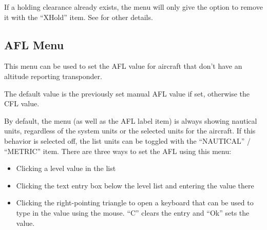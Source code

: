 \documentclass[a4paper,oneside,11pt]{memoir}
\begin{document}
If a holding clearance already exists, the menu will only give the option to remove it with the “XHold” item.
See  for other details.

\subsection{AFL Menu}
\label{menu:afl}

\begin{center}
  \begin{minipage}[b]{0.14\textwidth}\end{minipage}\hfill 
  \begin{minipage}[b]{0.14\textwidth}\end{minipage}\hfill 
  \begin{minipage}[b]{0.14\textwidth}\end{minipage}\hfill  
  \begin{minipage}[b]{0.14\textwidth}\end{minipage}\hfill 
  \begin{minipage}[b]{0.14\textwidth}\end{minipage}\hfill 
\end{center}  

This menu can be used to set the AFL value for aircraft that don’t have an altitude reporting transponder.

\bigskip

The default value is the previously set manual AFL value if set, otherwise the CFL value.

\bigskip

By default, the menu (as well as the AFL label item) is always showing nautical units, regardless of the system units or the selected units for the aircraft. If this behavior is selected off, the list units can be toggled with the “NAUTICAL” / “METRIC” item. There are three ways to set the AFL using this menu:

\bigskip

\begin{itemize}
        \item Clicking a level value in the list
        \item Clicking the text entry box below the level list and entering the value there
        \item Clicking the right-pointing triangle to open a keyboard that can be used to type in the value using the mouse. “C” clears the entry and “Ok” sets the value.
\end{itemize}
\end{document}
